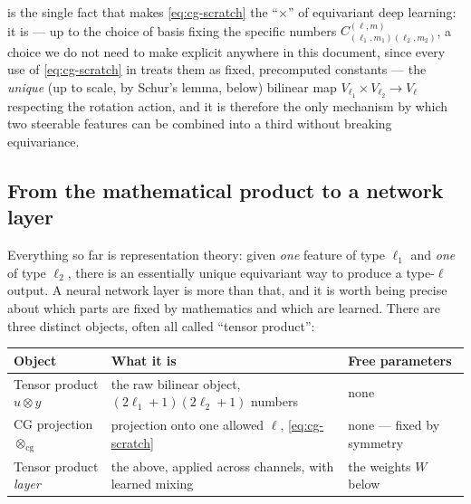 \documentclass[11pt,a4paper]{report}
\theoremstyle{definition}
\theoremstyle{remark}
\begin{document}
 is the single fact that makes
\eqref{eq:cg-scratch} the ``$\times$'' of equivariant deep learning: it is
--- up to the choice of basis fixing the specific numbers
$C^{(\ell,m)}_{(\ell_1,m_1)(\ell_2,m_2)}$, a choice we do not need to make
explicit anywhere in this document, since every use of
\eqref{eq:cg-scratch} in  treats them as fixed,
precomputed constants --- the \emph{unique} (up to scale, by Schur's lemma,
 below) bilinear map $V_{\ell_1}\times V_{\ell_2}\to V_\ell$
respecting the rotation action, and it is therefore the only mechanism by
which two steerable features can be combined into a third without breaking
equivariance.

\subsection{From the mathematical product to a network layer}
\label{sec:tp-layer}

Everything so far is representation theory: given \emph{one} feature of type
$\ell_1$ and \emph{one} of type $\ell_2$, there is an essentially unique
equivariant way to produce a type-$\ell$ output. A neural network layer is
more than that, and it is worth being precise about which parts are fixed by
mathematics and which are learned. There are three distinct objects, often
all called ``tensor product'':

\begin{center}
\begin{tabular}{p{3.4cm}p{5.2cm}p{4.4cm}}
\toprule
Object & What it is & Free parameters \\
\midrule
Tensor product $u\otimes y$ & the raw bilinear object, $(2\ell_1+1)(2\ell_2+1)$ numbers & none \\
CG projection $\otimes_{\mathrm{cg}}$ & projection onto one allowed $\ell$, \eqref{eq:cg-scratch} & none --- fixed by symmetry \\
Tensor product \emph{layer} & the above, applied across channels, with learned mixing & the weights $W$ below \\
\bottomrule
\end{tabular}
\end{center}
\end{document}

